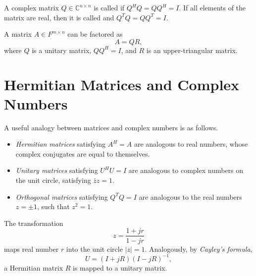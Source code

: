 A complex matrix $Q \in \mathbb{C}^{n \times n}$ is called  if $Q^H Q = Q Q^H = I$.
If all elements of the matrix are real, then it is called  and $Q^T Q = Q Q^T = I$.

A matrix $A \in F^{m \times n}$ can be factored as
\begin{equation*}
A = Q R,
\end{equation*}
where $Q$ is a unitary matrix, $QQ^H = I$, and $R$ is an upper-triangular matrix.

\section{Hermitian Matrices and Complex Numbers}

A useful analogy between matrices and complex numbers is as follows.
\begin{itemize}
\item \emph{Hermitian matrices} satisfying $A^H = A$ are analogous to real numbers, whose complex conjugates are equal to themselves.
\item \emph{Unitary matrices} satisfying $U^H U = I$ are analogous to complex numbers on the unit circle, satisfying $\bar{z}z = 1$.
\item \emph{Orthogonal matrices} satisfying $Q^TQ = I$ are analogous to the real numbers $z = \pm 1$, such that $z^2 = 1$.
\end{itemize}

The transformation
\begin{equation*}
z = \frac{1 + jr}{1 - jr}
\end{equation*}
maps real number $r$ into the unit circle $|z| = 1$.
Analogously, by \emph{Cayley's formula},
\begin{equation*}
U = (I + jR) (I - jR)^{-1},
\end{equation*}
a Hermitian matrix $R$ is mapped to a unitary matrix.



